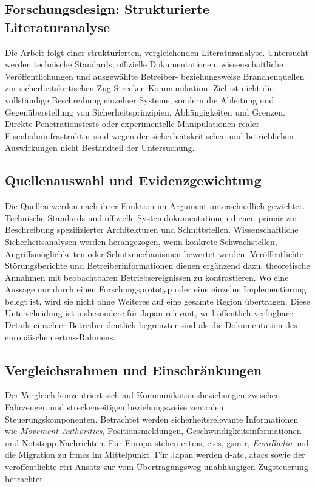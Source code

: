 \documentclass[runningheads]{res/llncs}
\begin{document}
\subsection{Forschungsdesign: Strukturierte Literaturanalyse}
\label{sec:Forschungsdesign_Strukturierte_Literaturanalyse}

Die Arbeit folgt einer strukturierten, vergleichenden Literaturanalyse. Untersucht werden technische Standards, offizielle Dokumentationen, wissenschaftliche Veröffentlichungen und ausgewählte Betreiber- beziehungsweise Branchenquellen zur sicherheitskritischen Zug-Strecken-Kommunikation. Ziel ist nicht die vollständige Beschreibung einzelner Systeme, sondern die Ableitung und Gegenüberstellung von Sicherheitsprinzipien, Abhängigkeiten und Grenzen. Direkte Penetrationstests oder experimentelle Manipulationen realer Eisenbahninfrastruktur sind wegen der sicherheitskritischen und betrieblichen Auswirkungen nicht Bestandteil der Untersuchung.

\subsection{Quellenauswahl und Evidenzgewichtung}
\label{sec:Quellenauswahl_und_Evidenzgewichtung}

Die Quellen werden nach ihrer Funktion im Argument unterschiedlich gewichtet. Technische Standards und offizielle Systemdokumentationen dienen primär zur Beschreibung spezifizierter Architekturen und Schnittstellen. Wissenschaftliche Sicherheitsanalysen werden herangezogen, wenn konkrete Schwachstellen, Angriffsmöglichkeiten oder Schutzmechanismen bewertet werden. Veröffentlichte Störungsberichte und Betreiberinformationen dienen ergänzend dazu, theoretische Annahmen mit beobachtbaren Betriebsereignissen zu kontrastieren. Wo eine Aussage nur durch einen Forschungsprototyp oder eine einzelne Implementierung belegt ist, wird sie nicht ohne Weiteres auf eine gesamte Region übertragen. Diese Unterscheidung ist insbesondere für Japan relevant, weil öffentlich verfügbare Details einzelner Betreiber deutlich begrenzter sind als die Dokumentation des europäischen \gls{ertms}-Rahmens.

\subsection{Vergleichsrahmen und Einschränkungen}
\label{sec:Vergleichsrahmen_und_Einschränkungen}

Der Vergleich konzentriert sich auf Kommunikationsbeziehungen zwischen Fahrzeugen und streckenseitigen beziehungsweise zentralen Steuerungskomponenten. Betrachtet werden sicherheitsrelevante Informationen wie \textit{Movement Authorities}, Positionsmeldungen, Geschwindigkeitsinformationen und Notstopp-\linebreak Nachrichten. Für Europa stehen \gls{ertms}, \gls{etcs}, \gls{gsm-r}, \textit{EuroRadio} und die Migration zu \gls{frmcs} im Mittelpunkt. Für Japan werden \gls{d-atc}, \gls{atacs} sowie der veröffentlichte \gls{rtri}-Ansatz zur vom Übertragungsweg unabhängigen Zugsteuerung betrachtet.
\end{document}
